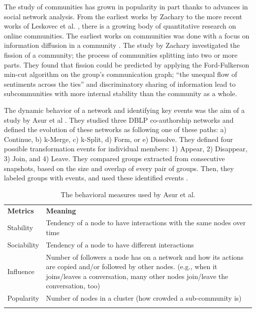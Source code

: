 \documentclass[11pt]{report}
\begin{document}
The study of communities has grown in popularity in part thanks to advances in social network analysis.  From the earliest works by Zachary \cite{Zachary} to the more recent works of Leskovec et al. \cite{LeskovecGraphsOverTime}\cite{LeskovecStatisticalPropertiesOfCommunityStructure}, there is a growing body of quantitative research on online communities. The earliest works on communities was done with a focus on information diffusion in a community \cite{Zachary}. The study by Zachary investigated the fission of a community; the process of communities splitting into two or more parts. They found that fission could be predicted by applying the Ford-Fulkerson min-cut algorithm \cite{Ford} on the group's communication graph; ``the unequal flow of sentiments across the ties'' and discriminatory sharing of information lead to subcommunities with more internal stability than the community as a whole.\cite{Zachary}

The dynamic behavior of a network and identifying key events was the aim of a study by Asur et al \cite{Asur}. They studied three DBLP co-authorship networks and defined the evolution of these networks as following one of these paths: a) Continue, b) k-Merge, c) k-Split, d) Form, or e) Dissolve. They defined four possible transformation events for individual members: 1) Appear, 2) Disappear, 3) Join, and 4) Leave. They compared groups extracted from consecutive snapshots, based on the size and overlap of every pair of groups. Then, they labeled groups with events, and used these identified events \cite{Asur}.

\begin{table}[!htbp]
\caption{The behavioral measures used by Asur et al. \cite{Asur}}
\label{tableDiversityMeasuresAsurEtAl} 
\begin{tabular}{p{} p{}}
\hline\noalign{\smallskip}
\textbf{Metrics} & \textbf{Meaning} \\
\noalign{\smallskip}\hline\noalign{\smallskip}
Stability & Tendency of a node to have interactions with the same nodes over time \\ \hline
Sociability & Tendency of a node to have different interactions \\\hline
Influence & Number of followers a node has on a network and how its actions are copied and/or followed by other nodes. (e.g., when it joins/leaves a conversation, many other nodes join/leave the conversation, too) \\\hline
Popularity & Number of nodes in a cluster (how crowded a sub-community is) \\
\noalign{\smallskip}\hline
\end{tabular}
\end{table}
\end{document}
